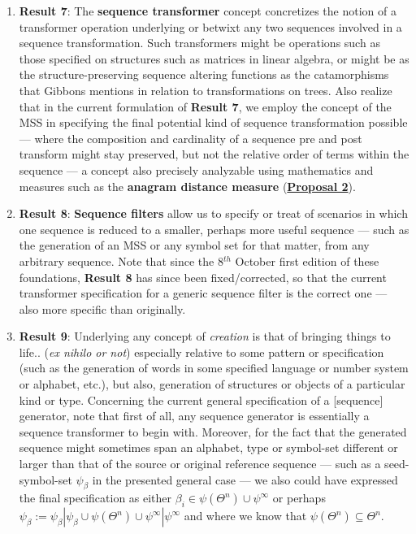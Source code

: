 \documentclass[a4paper, 18pt]{book} %
\begin{document}
\begin{appendices}
{\begin{enumerate}
\item \textbf{Result 7}: The \textbf{sequence transformer} concept concretizes the notion of a transformer operation underlying or betwixt any two sequences involved in a sequence transformation. Such transformers might be operations such as those specified on structures such as matrices in linear algebra, or might be as the structure-preserving sequence altering functions as the catamorphisms that Gibbons mentions in relation to transformations on trees\cite{treealgebras_review}. Also realize that in the current formulation of \textbf{Result 7}, we employ the concept of the MSS in specifying the final potential kind of sequence transformation possible --- where the composition and cardinality of a sequence pre and post transform might stay preserved, but not the relative order of terms within the sequence --- a concept also precisely analyzable using mathematics and measures such as the \textbf{anagram distance measure} (\textbf{\hyperref[PROP2]{Proposal 2}}).
\item \textbf{Result 8}: \textbf{Sequence filters} allow us to specify or treat of scenarios in which one sequence is reduced to a smaller, perhaps more useful sequence --- such as the generation of an MSS or any symbol set for that matter, from any arbitrary sequence. Note that since the 8$^{th}$ October first edition of these foundations, \textbf{Result 8} has since been fixed/corrected, so that the current transformer specification for a generic sequence filter is the correct one --- also more specific than originally.
\item \textbf{Result 9}: Underlying any concept of \textit{creation} is that of bringing things to life.. (\textit{ex nihilo or not}) especially relative to some pattern or specification (such as the generation of words in some specified language or number system or alphabet, etc.), but also, generation of structures or objects of a particular kind or type. Concerning the current general specification of a [sequence] generator, note that first of all, any sequence generator is essentially a sequence transformer to begin with. Moreover, for the fact that the generated sequence might sometimes span an alphabet, type or symbol-set different or larger than that of the source or original reference sequence --- such as a seed-symbol-set $\psi_\beta$ in the presented general case --- we also could have expressed the final specification as either $\beta_i \in \psi(\Theta^n) \cup \psi^\infty$ or perhaps $\psi_\beta := \psi_\beta | \psi_\beta \cup \psi(\Theta^n) \cup \psi^\infty | \psi^\infty$ and where we know that $\psi(\Theta^n) \subseteq \Theta^n$.

\end{enumerate}}
\end{appendices}
\end{document}
